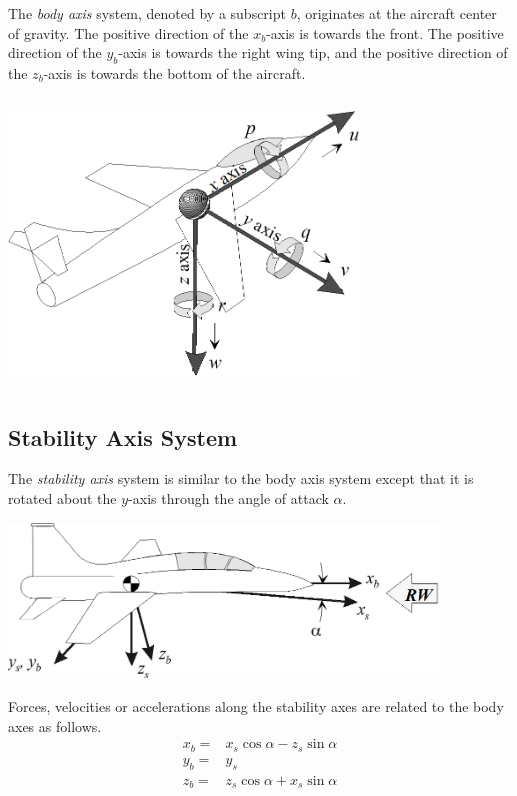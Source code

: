\documentclass[
]{book}
\begin{document}
The \emph{body axis} system, denoted by a subscript \(b\), originates at the aircraft center of gravity. The positive direction of the \(x_b\)-axis is towards the front. The positive direction of the \(y_b\)-axis is towards the right wing tip, and the positive direction of the \(z_b\)-axis is towards the bottom of the aircraft.

\includegraphics[width=3.65625in,height=3.03125in]{media/06/image2.png}

\hypertarget{stability-axis-system}{%
\subsection{Stability Axis System}\label{stability-axis-system}}

The \emph{stability axis} system is similar to the body axis system except that it is rotated about the \(y\)-axis through the angle of attack \(\alpha\).

\includegraphics[width=4.5in,height=1.625in]{media/06/image4.png}

Forces, velocities or accelerations along the stability axes are related to the body axes as follows.
\begin{align}
x_b =& x_s \cos \alpha − z_s \sin \alpha \\
y_b =& y_s \\
z_b =& z_s \cos \alpha + x_s \sin \alpha
\end{align}
\end{document}
